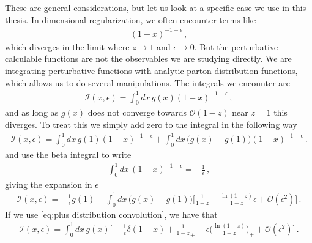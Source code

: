 These are general considerations, but let us look at a specific case we use in this thesis. In dimensional regularization, we often encounter terms like
\begin{align}
    (1-x)^{-1-\epsilon}\,,
\end{align}
which diverges in the limit where $z\rightarrow 1$ and $\epsilon\rightarrow 0$. But the perturbative calculable functions are not the observables we are studying directly. We are integrating perturbative functions with analytic parton distribution functions, which allows us to do several manipulations. The integrals we encounter are
\begin{align}
    \mathcal{I}(x,\epsilon)=\int_{0}^{1}dx\,g(x)(1-x)^{-1-\epsilon}\,,
\end{align}
and as long as $g(x)$ does not converge towards $\mathcal{O}(1-z)$ near $z=1$ this diverges. To treat this we simply add zero to the integral in the following way
\begin{align}
    \mathcal{I}(x,\epsilon)=\int_{0}^{1}dx\,g(1)(1-x)^{-1-\epsilon}+\int_{0}^{1}dx\,\big(g(x)-g(1)\big)(1-x)^{-1-\epsilon}\,.
\end{align}
and use the beta integral to write
\begin{align}
    \int_{0}^{1}dx\,(1-x)^{-1-\epsilon}=-\frac{1}{\epsilon}\,,
\end{align}
giving the expansion in $\epsilon$
\begin{align}
    \mathcal{I}(x,\epsilon)=-\frac{1}{\epsilon}g(1)+\int_{0}^{1}dx\,\big(g(x)-g(1)\big)\Big[\frac{1}{1-z}-\frac{\ln(1-z)}{1-z}\epsilon+\mathcal{O}(\epsilon^{2})\Big]\,.
\end{align}
If we use \cref{eq:plus distribution convolution}, we have that
\begin{align}
    \mathcal{I}(x,\epsilon)=\int_{0}^{1}dx\,g(x)\Big[-\frac{1}{\epsilon}\delta(1-x)+\frac{1}{1-z}_{+}-\epsilon\Big(\frac{\ln(1-z)}{1-z}\Big)_{+}+\mathcal{O}(\epsilon^{2})\Big]\,.
\end{align}